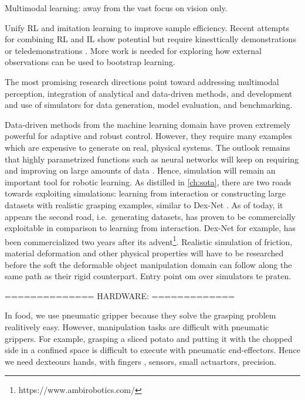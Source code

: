 \documentclass[\home/main.tex]{subfiles}
\begin{document}
Multimodal learning: away from the vast focus on vision only. 

Unify RL and imitation learning to improve sample efficiency. Recent attempts for combining RL and IL show potential but require kinesttically demonstrations \autocite{vecerik2018leveraging} or teledemonstrations \autocite{Zhu-RSS-18}. More work is needed for exploring how external observations can be used to bootstrap learning. 


The most promising research directions point toward addressing multimodal perception, integration of analytical and data-driven methods, and development and use of simulators for data generation, model evaluation, and benchmarking.

Data-driven methods from the machine learning domain have proven extremely powerful for adaptive and robust control. However, they require many examples which are expensive to generate on real, physical systems. The outlook remains that highly parametrized functions such as neural networks will keep on requiring and improving on large amounts of data \autocite{sun2017revisiting}. Hence, simulation will remain an important tool for robotic learning. As distilled in \cref{ch:sota}, there are two roads towards exploiting simulations: learning from interaction or constructing large datasets with realistic grasping examples, similar to Dex-Net \autocite{dexnet}. As of today, it appears the second road, i.e.\ generating datasets, has proven to be commercially exploitable in comparison to learning from interaction. Dex-Net for example, has been commercialized two years after its advent\footnote{https://www.ambirobotics.com/}. Realistic simulation of friction, material deformation and other physical properties will have to be researched before the soft the deformable object manipulation domain can follow along the same path as their rigid counterpart. Entry point om over simulators te praten.

==============
HARDWARE:
=============

In food, we use pneumatic gripper because they solve the grasping problem realitively easy. However, manipulation tasks are difficult with pneumatic grippers. For example, grasping a sliced potato and putting it with the chopped side in a confined space is difficult to execute with pneumatic end-effectors. Hence we need dexteours hands, with fingers , sensors, small actuartors, precision. 
\end{document}
